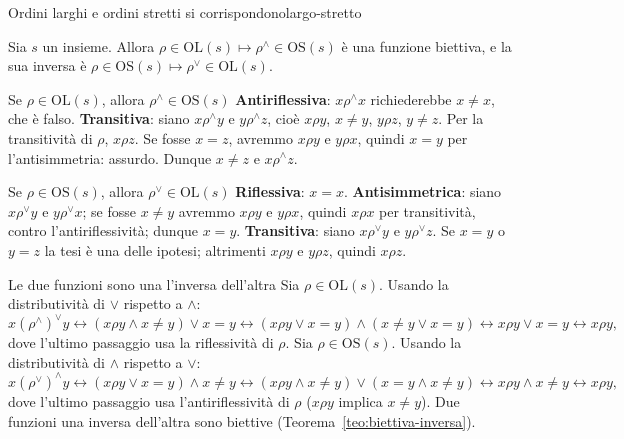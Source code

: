 \begin{concetto}
\begin{Teorema}{Ordini larghi e ordini stretti si corrispondono}{largo-stretto}
    \begin{prerequisiti}
    \end{prerequisiti}
    Sia $s$ un insieme. Allora $\rho \in \mathrm{OL}(s) \mapsto \rho^\wedge \in \mathrm{OS}(s)$ è una funzione biettiva, e la sua inversa è
    $\rho \in \mathrm{OS}(s) \mapsto \rho^\vee \in \mathrm{OL}(s)$.
\end{Teorema}
\begin{dimostrazione}
    \facoltativa
    \begin{caso}{Se $\rho \in \mathrm{OL}(s)$, allora $\rho^\wedge \in \mathrm{OS}(s)$}
        \textbf{Antiriflessiva}: $x \rho^\wedge x$ richiederebbe $x \neq x$, che è falso. \textbf{Transitiva}: siano $x \rho^\wedge y$ e
        $y \rho^\wedge z$, cioè $x \rho y$, $x \neq y$, $y \rho z$, $y \neq z$. Per la transitività di $\rho$, $x \rho z$. Se fosse $x = z$,
        avremmo $x \rho y$ e $y \rho x$, quindi $x = y$ per l'antisimmetria: assurdo. Dunque $x \neq z$ e $x \rho^\wedge z$.
    \end{caso}
    \begin{caso}{Se $\rho \in \mathrm{OS}(s)$, allora $\rho^\vee \in \mathrm{OL}(s)$}
        \textbf{Riflessiva}: $x = x$. \textbf{Antisimmetrica}: siano $x \rho^\vee y$ e $y \rho^\vee x$; se fosse $x \neq y$ avremmo
        $x \rho y$ e $y \rho x$, quindi $x \rho x$ per transitività, contro l'antiriflessività; dunque $x = y$. \textbf{Transitiva}: siano
        $x \rho^\vee y$ e $y \rho^\vee z$. Se $x = y$ o $y = z$ la tesi è una delle ipotesi; altrimenti $x \rho y$ e $y \rho z$, quindi $x \rho z$.
    \end{caso}
    \begin{caso}{Le due funzioni sono una l'inversa dell'altra}
        Sia $\rho \in \mathrm{OL}(s)$. Usando la distributività di $\vee$ rispetto a $\wedge$:
        \[ x (\rho^\wedge)^\vee y \leftrightarrow (x \rho y \wedge x \neq y) \vee x = y \leftrightarrow (x \rho y \vee x = y) \wedge (x \neq y \vee x = y)
           \leftrightarrow x \rho y \vee x = y \leftrightarrow x \rho y, \]
        dove l'ultimo passaggio usa la riflessività di $\rho$. Sia $\rho \in \mathrm{OS}(s)$. Usando la distributività di $\wedge$ rispetto a $\vee$:
        \[ x (\rho^\vee)^\wedge y \leftrightarrow (x \rho y \vee x = y) \wedge x \neq y \leftrightarrow (x \rho y \wedge x \neq y) \vee (x = y \wedge x \neq y)
           \leftrightarrow x \rho y \wedge x \neq y \leftrightarrow x \rho y, \]
        dove l'ultimo passaggio usa l'antiriflessività di $\rho$ ($x \rho y$ implica $x \neq y$). Due funzioni una inversa dell'altra
        sono biettive (Teorema~\ref{teo:biettiva-inversa}).
    \end{caso}
\end{dimostrazione}
\end{concetto}

